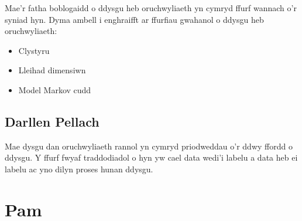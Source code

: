 Mae'r fatha boblogaidd o ddysgu heb oruchwyliaeth yn cymryd ffurf wannach o'r syniad hyn. Dyma ambell i enghraifft ar ffurfiau gwahanol o ddysgu heb oruchwyliaeth:

\begin{itemize}
	\item Clystyru
	\item Lleihad dimensiwn
	\item Model Markov cudd
\end{itemize} 

\subsection{Darllen Pellach}

Mae dysgu dan oruchwyliaeth rannol yn cymryd priodweddau o'r ddwy ffordd o ddysgu. Y ffurf fwyaf traddodiadol o hyn yw cael data wedi'i labelu a data heb ei labelu ac yno dilyn proses hunan ddysgu.


\section{Pam}


